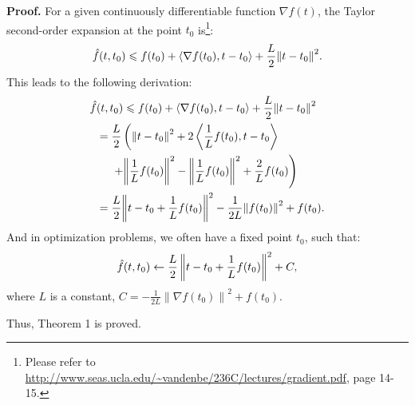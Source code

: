 \documentclass[10pt,journal,compsoc]{IEEEtran}
\begin{document}
\noindent
{\bf{Proof.}} For a given continuously differentiable function $\nabla f(t)$, the Taylor second-order expansion at the point $t_0$ is\footnote{Please refer to \url{http://www.seas.ucla.edu/~vandenbe/236C/lectures/gradient.pdf}, page 14-15.}:
\begin{equation}
\setlength{\abovedisplayskip}{2pt}
\setlength{\belowdisplayskip}{2pt}
\hat f(t,{t_0}) \leqslant f({t_0}) + \left \langle {\nabla f({t_0}),t - {t_0}} \right\rangle  + \frac{L}{2}{\left\| {t - {t_0}} \right\|^2}.
\end{equation}
This leads to the following derivation: 
\begin{equation}
\setlength{\abovedisplayskip}{2pt}
\setlength{\belowdisplayskip}{2pt}
\begin{aligned}
\hat f&(t,{t_0}) \leqslant f({t_0}) + \left \langle {\nabla f({t_0}),t - {t_0}} \right\rangle  + \frac{L}{2}{\left\| {t - {t_0}} \right\|^2} \\
&= \frac{L}{2} \left( {{\left\| {t - {t_0}} \right\|}^2} + 2\left\langle {\frac{1}{L}f({t_0}),t - {t_0}} \right\rangle 
 \right.\\
&~~~~\left. + {{\left\| {\frac{1}{L}f({t_0})} \right\|}^2} - {{\left\|{\frac{1}{L}f({t_0})} \right\|}^2} + \frac{2}{L}f({t_0}) \right)\\
& = \frac{L}{2}{\left\| {t - {t_0} + \frac{1}{L}f({t_0})} \right\|^2} - \frac{1}{{2L}}{\left\| {f({t_0})} \right\|^2} + f({t_0}).
\end{aligned}
\end{equation}
And in optimization problems, we often have a fixed point $t_0$, such that:
\begin{equation}
\setlength{\abovedisplayskip}{2pt}
\setlength{\belowdisplayskip}{2pt}
\hat f(t,{t_0})  \leftarrow \frac{L}{2}\left\| {t - {t_0} + \frac{1}{L}f({t_0})} \right\|^2 + C,
\end{equation}
where $L$ is a constant, $C =  - \frac{1}{{2{L}}}{\left\| \nabla{f({t_0})} \right\|^2} + f({t_0})$. 

Thus, Theorem 1 is proved.
\ifCLASSOPTIONcompsoc

\ifCLASSOPTIONcaptionsoff
  \newpage
\fi


\end{document}
